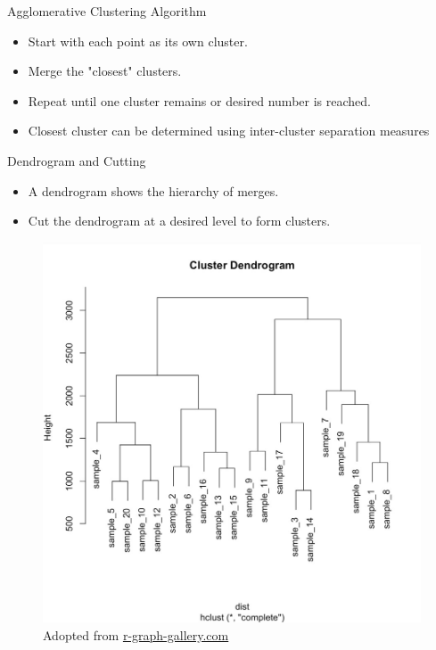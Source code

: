 \documentclass[serif, aspectratio=169]{beamer}
\begin{document}
\begin{frame}{Agglomerative Clustering Algorithm}
    \begin{itemize}
        \item Start with each point as its own cluster.
        \item Merge the "closest" clusters.
        \item Repeat until one cluster remains or desired number is reached.
        \item Closest cluster can be determined using inter-cluster separation measures
    \end{itemize}
\end{frame}

\begin{frame}{Dendrogram and Cutting}
    \begin{itemize}
        \item A dendrogram shows the hierarchy of merges.
        \item Cut the dendrogram at a desired level to form clusters.
    \end{itemize}
    \begin{figure}
        \centering
        \includegraphics[scale=0.30]{pic/figs/dendrogram.jpg}
        {\scriptsize Adopted from \href{https://r-graph-gallery.com/29-basic-dendrogram.html}{r-graph-gallery.com}}
       
        \label{fig:dendrogram}
    \end{figure}
\end{frame}
\end{document}
